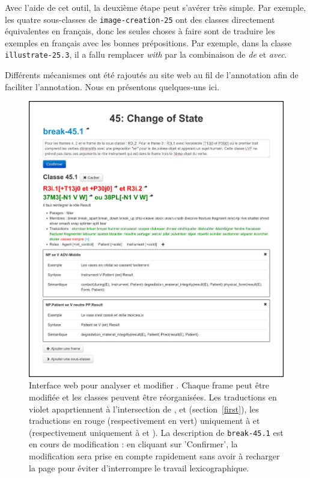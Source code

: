 Avec l'aide de cet outil, la deuxième étape peut s'avérer très simple. Par
exemple, les quatre sous-classes de {\color{blue}\texttt{image-creation-25}}
ont des classes directement équivalentes en français, donc les seules choses à
faire sont de traduire les exemples en français avec les bonnes prépositions.
Par exemple, dans la classe {\color{blue}\texttt{illustrate-25.3}}, il a fallu
remplacer \textit{with} par la combinaison de \textit{de} et \textit{avec}.

Différents mécanismes ont été rajoutés au site web au fil de l'annotation afin
de faciliter l'annotation. Nous en présentons quelques-uns ici.

\begin{figure}[p]

    \includegraphics[width=\textwidth]{fig/tool_screenshot_2014-09-12.png}

    \caption{\label{tool}Interface web pour analyser et modifier \verbenet{}.
        Chaque frame peut être modifiée et les classes peuvent être
        réorganisées. Les traductions en violet apaprtiennent à l'intersection
        de \Clvf{}, \Clg{} et \Ltrad{} (section~\ref{first}), les traductions
        en rouge (respectivement en vert) uniquement à \Clvf{} et \Ltrad{}
        (respectivement uniquement à \Clg{} et \Ltrad{}). La description de
        {\color{blue}\texttt{break-45.1}} est en cours de modification : en cliquant sur
        'Confirmer', la modification sera prise en compte rapidement sans avoir
    à recharger la page pour éviter d'interrompre le travail lexicographique.}
\end{figure}


